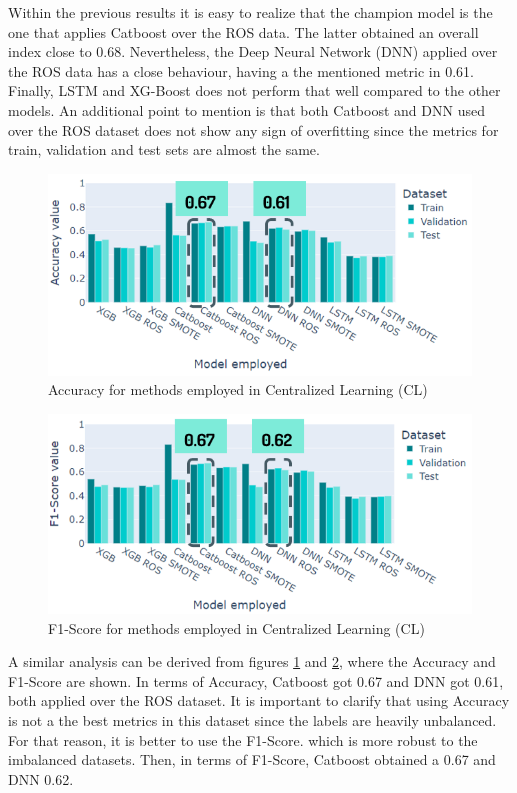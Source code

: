 Within the previous results it is easy to realize that the champion model is the one that applies Catboost over the ROS data. The latter obtained an overall index close to 0.68. Nevertheless, the Deep Neural Network (DNN) applied over the ROS data has a close behaviour, having a the mentioned metric in 0.61. Finally, LSTM and XG-Boost does not perform that well compared to the other models. An additional point to mention is that both Catboost and DNN used over the ROS dataset does not show any sign of overfitting since the metrics for train, validation and test sets are almost the same.

\begin{figure}[H]
\centering
\includegraphics[scale=0.7]{img/cl_accuracy_methods.PNG}
\caption{Accuracy for methods employed in Centralized Learning (CL)}
\label{fig:cl_accuracy_methods}
\end{figure}

\begin{figure}[H]
\centering
\includegraphics[scale=0.7]{img/cl_f1score_methods.PNG}
\caption{F1-Score for methods employed in Centralized Learning (CL)}
\label{fig:cl_f1score_methods}
\end{figure}

A similar analysis can be derived from figures \ref{fig:cl_accuracy_methods} and \ref{fig:cl_f1score_methods}, where the Accuracy and F1-Score are shown. In terms of Accuracy, Catboost got 0.67 and DNN got 0.61, both applied over the ROS dataset. It is important to clarify that using Accuracy is not a the best metrics in this dataset since the labels are heavily unbalanced. For that reason, it is better to use the F1-Score. which is more robust to the imbalanced datasets. Then, in terms of F1-Score, Catboost obtained a 0.67 and DNN 0.62.

